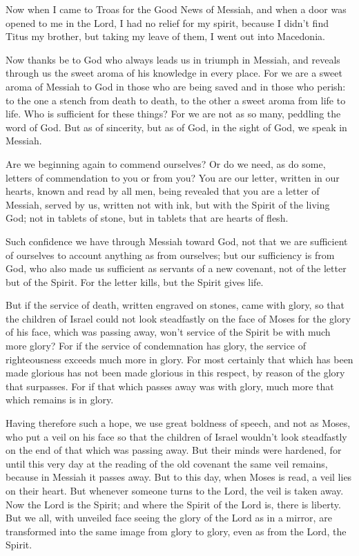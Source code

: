 \myverse{}Now when I came to Troas for the Good News of Messiah, and when
a door was opened to me in the Lord,
\myverse{}I had no relief for my spirit, because I didn’t find Titus my brother, but
taking my leave of them, I went out into Macedonia.

\myverse{}Now thanks be to God who always leads us in triumph in Messiah,
and reveals through us the sweet aroma of his knowledge in every place.
\myverse{}For we are a sweet aroma of Messiah to God in those who are being saved and
in those who perish:
\myverse{}to the one a stench from death to death, to the other a sweet aroma from life
to life. Who is sufficient for these things?
\myverse{}For we are not as so many, peddling the word of God. But as of sincerity,
but as of God, in the sight of God, we speak in Messiah.


\mychapter{} \myverse*{}Are we beginning again to commend ourselves? Or do we need, as
do some, letters of commendation to you or from you?
\myverse{}You are our letter, written in our hearts, known and read by all men,
\myverse{}being revealed that you are a letter of Messiah, served by us, written not with
ink, but with the Spirit of the living God; not in tablets of stone, but in tablets that are hearts of
flesh.

\myverse{}Such confidence we have through Messiah toward God,
\myverse{}not that we are sufficient of ourselves to account anything as from ourselves;
but our sufficiency is from God,
\myverse{}who also made us sufficient as servants of a new covenant, not of the letter
but of the Spirit. For the letter kills, but the Spirit gives life.

\myverse{}But if the service of death, written engraved on stones, came with
glory, so that the children of Israel could not look steadfastly on the face of Moses for the glory of
his face, which was passing away,
\myverse{}won’t service of the Spirit be with much more glory?
\myverse{}For if the service of condemnation has glory, the service of righteousness exceeds
much more in glory.
\myverse{}For most certainly that which has been made glorious has not been made glorious
in this respect, by reason of the glory that surpasses.
\myverse{}For if that which passes away was with glory, much more that which remains
is in glory.

\myverse{}Having therefore such a hope, we use great boldness of speech,
\myverse{}and not as Moses, who put a veil on his face so that the children of Israel
wouldn’t look steadfastly on the end of that which was passing away.
\myverse{}But their minds were hardened, for until this very day at the reading of the
old covenant the same veil remains, because in Messiah it passes away.
\myverse{}But to this day, when Moses is read, a veil lies on their heart.
\myverse{}But whenever someone turns to the Lord, the veil is taken away.
\myverse{}Now the Lord is the Spirit; and where the Spirit of the Lord is, there is
liberty.
\myverse{}But we all, with unveiled face seeing the glory of the Lord as in a mirror,
are transformed into the same image from glory to glory, even as from the Lord, the Spirit.


